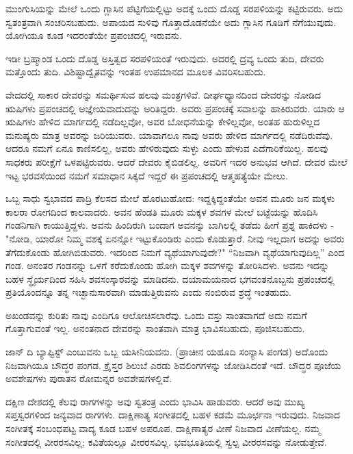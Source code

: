 ಮುಂಗುಸಿಯನ್ನು ಮೇಲೆ ಒಂದು ಗ್ಲಾಸಿನ ಪೆಟ್ಟಿಗೆಯಲ್ಲಿಟ್ಟು ಅದಕ್ಕೆ ಒಂದು ದೊಡ್ಡ ಸರಪಳಿಯನ್ನು ಕಟ್ಟಿರುವರು. ಅದು ಸ್ವತಂತ್ರವಾಗಿ ಸಂಚರಿಸಬಹುದು. ಅಪಾಯದ ಸುಳಿವು ಗೊತ್ತಾದೊಡನೆಯೇ ಅದು ಗ್ಲಾಸಿನ ಗೂಡಿಗೆ ನೆಗೆಯುವುದು. ಯೋಗಿಯೂ ಕೂಡ ಇದರಂತೆಯೇ ಪ್ರಪಂಚದಲ್ಲಿ ಇರುವನು.

ಇಡೀ ಬ್ರಹ್ಮಾಂಡ ಒಂದು ದೊಡ್ಡ ಅಸ್ತಿತ್ವದ ಸರಪಳಿಯಂತೆ ಇರುವುದು. ಅದರಲ್ಲಿ ದ್ರವ್ಯ  ಒಂದು ತುದಿ, ದೇವರು ಮತ್ತೊಂದು ತುದಿ. ವಿಶಿಷ್ಟಾದ್ವೈತವನ್ನು ಇಂತಹ ಉಪಮಾನದ ಮೂಲಕ ವಿವರಿಸಬಹುದು.

ವೇದದಲ್ಲಿ ಸಾಕಾರ ದೇವರನ್ನು ಸಮರ್ಥಿಸುವ ಹಲವು ಮಂತ್ರಗಳಿವೆ. ದೀರ್ಘಧ್ಯಾನದಿಂದ ದೇವರನ್ನು ನೋಡಿದ ಋಷಿಗಳು ಪ್ರಪಂಚದಲ್ಲಿ ಅಜ್ಞೇಯವಾದುದನ್ನು ಅರಿತಿದ್ದರು. ಅವರು ಪ್ರಪಂಚಕ್ಕೆ ಸವಾಲನ್ನು ಹಾಕಿರುವರು. ಯಾರು ಆ ಋಷಿಗಳು ಹೇಳಿದ ಮಾರ್ಗದಲ್ಲಿ ನಡೆದಿಲ್ಲವೋ, ಅವರ ಬೋಧನೆಯನ್ನು ಕೇಳಿಲ್ಲವೋ, ಅಂತಹ ಹುರುಳಿಲ್ಲದ ಮನುಷ್ಯರು ಮಾತ್ರ ಅವರನ್ನು ಜರಿಯುವರು. ಯಾವಾಗಲೂ ನಾವು ಅವರು ಹೇಳಿದ ಮಾರ್ಗದಲ್ಲಿ ನಡೆದಿರುವೆವು. ಆದರೂ ನಮಗೆ ಏನೂ ಕಾಣಿಸಲಿಲ್ಲ, ಅವರು ಹೇಳಿರುವುದು ಸುಳ್ಳು ಎಂದು ಹೇಳುವ ಎದೆಗಾರಿಕೆಯಿಲ್ಲ. ಹಲವು ಸಾಧಕರು ಪರೀಕ್ಷೆಗೆ ಒಳಪಟ್ಟಿರುವರು. ಆದರೆ ದೇವರು ಕೈಬಿಡಲಿಲ್ಲ. ಅವರಿಗೆ ಇದರ ಅನುಭವ ಆಗಿದೆ. ದೇವರ ಮೇಲೆ ಇಟ್ಟ ಭರವಸೆಯಿಂದ ನಮಗೆ ಸಮಾಧಾನ ಸಿಕ್ಕದೆ ಇದ್ದರೆ ಈ ಪ್ರಪಂಚದಲ್ಲಿ ಆತ್ಮಹತ್ಯೆಯೇ ಮೇಲು.

ಒಬ್ಬ ಸಾಧು ಸ್ವಭಾವದ ಪಾದ್ರಿ ಕೆಲಸದ ಮೇಲೆ ಹೊರಟುಹೋದ: ಇದ್ದಕ್ಕಿದ್ದಂತೆಯೇ ಅವನ ಮೂರು ಜನ ಮಕ್ಕಳು ಕಾಲರಾ ರೋಗದಿಂದ ಕಾಲವಾದರು. ಅವನ ಹೆಂಡತಿ ಮೂರು ಮಕ್ಕಳ ಶವಗಳ ಮೇಲೆ ಬಟ್ಟೆಯನ್ನು ಹೊದಿಸಿ ಗಂಡನಿಗಾಗಿ ಕಾಯುತ್ತಿದ್ದಳು. ಅವನು ಹಿಂದಿರುಗಿ ಬಂದಾಗ ಅವನನ್ನು ಬಾಗಿಲಲ್ಲಿ ತಡೆದು ಹೀಗೆ ಪ್ರಶ್ನೆ ಹಾಕಿದಳು - "ನೋಡಿ, ಯಾರೋ ನಿಮ್ಮ ವಶಕ್ಕೆ ಏನನ್ನೋ ಇಟ್ಟುಕೊಂಡಿರು ಎಂದು ಕೊಡುತ್ತಾರೆ. ನೀವು ಇಲ್ಲದಾಗ ಅದನ್ನು ಅವರು ತೆಗೆದುಕೊಂಡು ಹೋಗಿಬಿಡುವರು. ಇದರಿಂದ ನಿಮಗೆ ವ್ಯಥೆಯಾಗುವುದೇ?" “ನಿಜವಾಗಿ ವ್ಯಥೆಯಾಗುವುದಿಲ್ಲ” ಎಂದ ಗಂಡ. ಅನಂತರ ಗಂಡನನ್ನು ಒಳಗೆ ಕರೆದುಕೊಂಡು ಹೋಗಿ ಮಕ್ಕಳ ಶವಗಳನ್ನು ತೋರಿಸಿದಳು. ಅವನು ಇದನ್ನು ಬಹಳ ಸ್ಥೈರ್ಯದಿಂದ ಸಹಿಸಿ ಶವಸಂಸ್ಕಾರವನ್ನು ಮಾಡಿದನು. ದಯಾಮಯನಾದ ಭಗವಂತನೊಬ್ಬನು ಪ್ರಪಂಚದಲ್ಲಿ ಪ್ರತಿಯೊಂದನ್ನೂ ತನ್ನ ಇಚ್ಛಾನುಸಾರವಾಗಿ ಮಾಡುತ್ತಿರುವನು ಎಂದು ನಂಬಿರುವ ಶ್ರದ್ಧೆ ಇಂತಹುದು.

ಅಖಂಡವನ್ನು ಕುರಿತು ನಾವು ಎಂದಿಗೂ ಆಲೋಚಿಸಲಾರೆವು. ಒಂದು ವಸ್ತು ಸಾಂತವಾಗದೆ ಅದು ನಮಗೆ ಗೊತ್ತಾಗುವಂತೆ ಇಲ್ಲ. ಅನಂತನಾದ ದೇವರನ್ನು ಸಾಂತವಾಗಿ ಮಾತ್ರ ಭಾವಿಸಬಹುದು, ಪೂಜಿಸಬಹುದು.

ಜಾನ್ ದಿ ಬ್ಯಾಪ್ಟಿಸ್ಟ್ ಎಂಬುವನು ಒಬ್ಬ ಯಸೀನಿಯವನು. (ಪ್ರಾಚೀನ ಯಹೂದಿ ಸಂನ್ಯಾಸಿ ಪಂಗಡ) ಅದೊಂದು ನಿಜವಾಗಿಯೂ ಬೌದ್ಧರ ಪಂಗಡ. ಕ್ರೈಸ್ತರ ಶಿಲುಬೆ ಎರಡು ಶಿವಲಿಂಗಗಳನ್ನು ಜೋಡಿಸಿದಂತೆ ಇದೆ. ಬೌದ್ಧರ ಪೂಜೆಯ ಅವಶೇಷಗಳು ಪುರಾತನ ರೋಮನ್ನರ ಅವಶೇಷಗಳಲ್ಲಿವೆ.

ದಕ್ಷಿಣ ದೇಶದಲ್ಲಿ ಕೆಲವು ರಾಗಗಳನ್ನು ಅವು ಸ್ವತಂತ್ರ ಎಂದು ಭಾವಿಸಿ ಹಾಡುವರು. ಆದರೆ ಅವು ಮುಖ್ಯ ಸಪ್ತಸ್ವರಗಳಿಂದ ಜನ್ಯವಾದ ರಾಗಗಳು. ದಾಕ್ಷಿಣಾತ್ಯ ಸಂಗೀತದಲ್ಲಿ ಬಹಳ ಕಡಮೆ ಮೂರ್ಛನಾ ಇರುವುದು. ನಿಜವಾದ ಸಂಗೀತಕ್ಕೆ ಸಂಬಂಧಪಟ್ಟ ವಾದ್ಯ ಕೂಡ ಬಹಳ ಅಪರೂಪ. ದಾಕ್ಷಿಣಾತ್ಯರ ವೀಣೆ ನಿಜವಾದ ವೀಣೆಯಲ್ಲ. ನಮ್ಮ ಸಂಗೀತದಲ್ಲಿ ವೀರರಸವಿಲ್ಲ; ಕವಿತೆಯಲ್ಲೂ ವೀರರಸವಿಲ್ಲ. ಭವಭೂತಿಯಲ್ಲಿ ಸ್ವಲ್ಪ ವೀರರಸವನ್ನು ನೋಡುತ್ತೇವೆ.

\delimiter

